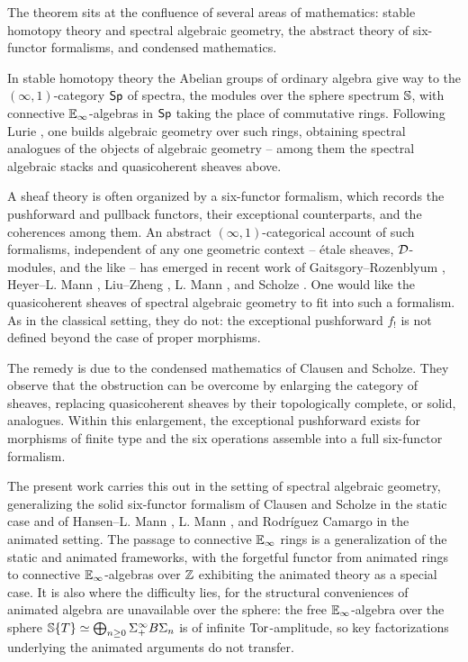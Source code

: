 The theorem sits at the confluence of several areas of mathematics: stable homotopy theory and spectral algebraic geometry, the abstract theory of six-functor formalisms, and condensed mathematics.

In stable homotopy theory the Abelian groups of ordinary algebra give way to the $(\infty,1)$-category $\mathsf{Sp}$ of spectra, the modules over the sphere spectrum $\mathbb{S}$, with connective $\mathbb{E}_{\infty}$-algebras in $\mathsf{Sp}$ taking the place of commutative rings. Following Lurie \cite{SAG}, one builds algebraic geometry over such rings, obtaining spectral analogues of the objects of algebraic geometry -- among them the spectral algebraic stacks and quasicoherent sheaves above.

A sheaf theory is often organized by a six-functor formalism, which records the pushforward and pullback functors, their exceptional counterparts, and the coherences among them. An abstract $(\infty,1)$-categorical account of such formalisms, independent of any one geometric context -- \'{e}tale sheaves, $\mathcal{D}$-modules, and the like -- has emerged in recent work of Gaitsgory--Rozenblyum \cite{GR-DAG}, Heyer--L. Mann \cite{HeyerMann6FF}, Liu--Zheng \cite{LiuZheng6FF}, L. Mann \cite{MannRigid6FF}, and Scholze \cite{Scholze6FF}. One would like the quasicoherent sheaves of spectral algebraic geometry to fit into such a formalism. As in the classical setting, they do not: the exceptional pushforward $f_{!}$ is not defined beyond the case of proper morphisms.

The remedy is due to the condensed mathematics of Clausen and Scholze. They observe that the obstruction can be overcome by enlarging the category of sheaves, replacing quasicoherent sheaves by their topologically complete, or solid, analogues. Within this enlargement, the exceptional pushforward exists for morphisms of finite type \cite[Thm. 8.13]{Condensed} and the six operations assemble into a full six-functor formalism.

The present work carries this out in the setting of spectral algebraic geometry, generalizing the solid six-functor formalism of Clausen and Scholze in the static case \cite{Condensed,Complex} and of Hansen--L. Mann \cite[\S 2.7]{HansenMannCLL}, L. Mann \cite[\S 2.9]{MannRigid6FF}, and Rodr\'{i}guez Camargo \cite{CamargoSolid} in the animated setting. The passage to connective $\mathbb{E}_{\infty}$ rings is a generalization of the static and animated frameworks, with the forgetful functor from animated rings to connective $\mathbb{E}_{\infty}$-algebras over $\mathbb{Z}$ exhibiting the animated theory as a special case. It is also where the difficulty lies, for the structural conveniences of animated algebra are unavailable over the sphere: the free $\mathbb{E}_{\infty}$-algebra over the sphere $\mathbb{S}\{T\}\simeq\bigoplus_{n\geq0}\Sigma^{\infty}_{+}B\Sigma_{n}$ is of infinite $\mathrm{Tor}$-amplitude, so key factorizations underlying the animated arguments do not transfer.
